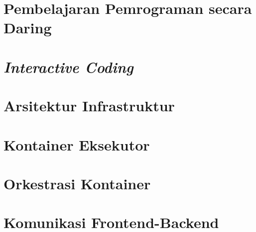 \section{Pembelajaran Pemrograman secara Daring}
\blindtext

\section{\textit{Interactive Coding}}
\blindtext

\section{Arsitektur Infrastruktur}
\blindtext

\section{Kontainer Eksekutor}
\blindtext

\section{Orkestrasi Kontainer}
\blindtext

\section{Komunikasi Frontend-Backend}
\blindtext

